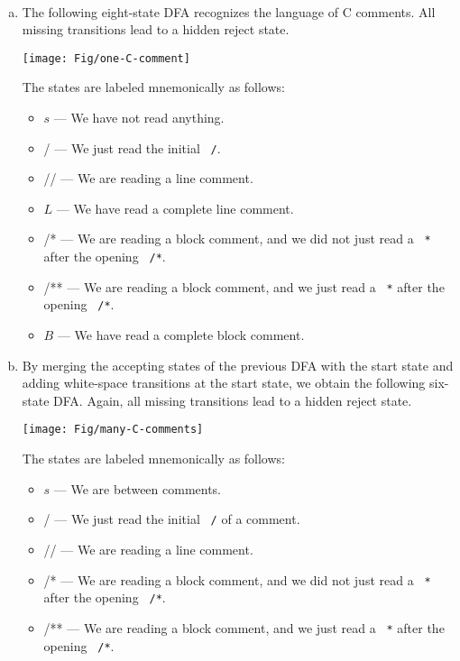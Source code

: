 \documentclass[11pt]{article}
\def\Sym#1{\texttt{\upshape \color{BrickRed} {#1}}}
\begin{document}
\begin{enumerate}
\newpage
\begin{solution}~
\begin{enumerate}[(a)]
\item
The following eight-state DFA recognizes the language of C comments.  All missing transitions lead to a hidden reject state.
\begin{center}
\texttt{[image: Fig/one-C-comment]}
\end{center}
The states are labeled mnemonically as follows:
\begin{itemize}
\item $s$ — We have not read anything.
\item / — We just read the initial \Sym/.
\item // — We are reading a line comment.
\item $L$ — We have read a complete line comment.
\item /* — We are reading a block comment, and we did not just read a \Sym* after the opening \Sym{/*}.
\item /** — We are reading a block comment, and we just read a \Sym* after the opening \Sym{/*}.
\item $B$ — We have read a complete block comment.
\end{itemize}

\bigskip\bigskip
\item
By merging the accepting states of the previous DFA with the start state and adding white-space transitions at the start state, we obtain the following six-state DFA.  Again, all missing transitions lead to a hidden reject state.
\begin{center}
\texttt{[image: Fig/many-C-comments]}
\end{center}
The states are labeled mnemonically as follows:
\begin{itemize}
\item $s$ — We are between comments.
\item / — We just read the initial \Sym/ of a comment.
\item // — We are reading a line comment.
\item /* — We are reading a block comment, and we did not just read a \Sym* after the opening \Sym{/*}.
\item /** — We are reading a block comment, and we just read a \Sym* after the opening \Sym{/*}.
\end{itemize}
\end{enumerate}
\end{solution}


\end{enumerate}
\end{document}
